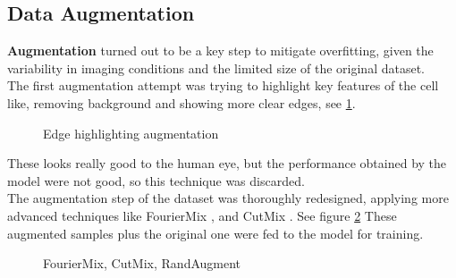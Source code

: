 \documentclass[10pt]{article}
\begin{document}
\begin{multicols}{2}
        \subsection{Data Augmentation}
        \label{sec:aug}
        \textbf{Augmentation} turned out to be a key step to mitigate overfitting, given the variability in imaging conditions and the limited size of the original dataset.\\
        The first augmentation attempt was trying to highlight key features of the cell like, removing background and showing more clear edges, see \ref{fig:edge}.
        \begin{figure}[H]
        \centering
        \caption{Edge highlighting augmentation}
        \label{fig:edge}
        \end{figure}
        These looks really good to the human eye, but the performance obtained by the model were not good, so this technique was discarded. \\
        The augmentation step of the dataset was thoroughly redesigned, applying more advanced techniques like FourierMix \cite{fouriermix}, and CutMix \cite{cutmix}. See figure \ref{fig:final_aug}
        These augmented samples plus the original one were fed to the model for training. 
        \begin{figure}[H]
        \centering
        \caption{FourierMix, CutMix, RandAugment}
        \label{fig:final_aug}
        \end{figure}
        

\end{multicols}
\end{document}
